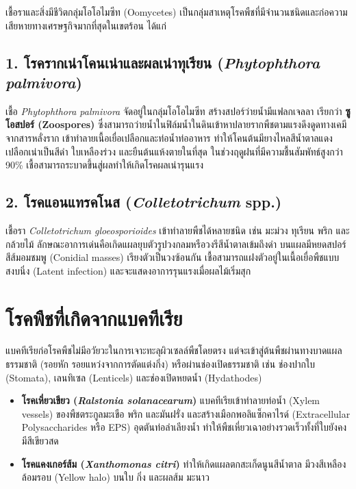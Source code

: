 เชื้อราและสิ่งมีชีวิตกลุ่มโอโอไมซีท (Oomycetes) เป็นกลุ่มสาเหตุโรคพืชที่มีจำนวนชนิดและก่อความเสียหายทางเศรษฐกิจมากที่สุดในเขตร้อน ได้แก่

\subsection{1. โรครากเน่าโคนเน่าและผลเน่าทุเรียน (\textit{Phytophthora palmivora})}
เชื้อ \textit{Phytophthora palmivora} จัดอยู่ในกลุ่มโอโอไมซีท สร้างสปอร์ว่ายน้ำมีแฟลกเจลลา เรียกว่า \textbf{ซูโอสปอร์ (Zoospores)} ซึ่งสามารถว่ายน้ำในฟิล์มน้ำในดินเข้าหาปลายรากพืชตามแรงดึงดูดทางเคมีจากสารหลั่งราก เข้าทำลายเนื้อเยื่อเปลือกและท่อน้ำท่ออาหาร ทำให้โคนต้นมียางไหลสีน้ำตาลแดง เปลือกเน่าเป็นสีดำ ใบเหลืองร่วง และยืนต้นแห้งตายในที่สุด ในช่วงฤดูฝนที่มีความชื้นสัมพัทธ์สูงกว่า 90\% เชื้อสามารถระบาดขึ้นสู่ผลทำให้เกิดโรคผลเน่ารุนแรง

\subsection{2. โรคแอนแทรคโนส (\textit{Colletotrichum} spp.)}
เชื้อรา \textit{Colletotrichum gloeosporioides} เข้าทำลายพืชได้หลายชนิด เช่น มะม่วง ทุเรียน พริก และกล้วยไม้ ลักษณะอาการเด่นคือเกิดแผลยุบตัวรูปวงกลมหรือวงรีสีน้ำตาลเข้มถึงดำ บนแผลมีหยดสปอร์สีส้มอมชมพู (Conidial masses) เรียงตัวเป็นวงซ้อนกัน เชื้อสามารถแฝงตัวอยู่ในเนื้อเยื่อพืชแบบสงบนิ่ง (Latent infection) และจะแสดงอาการรุนแรงเมื่อผลไม้เริ่มสุก

\section{โรคพืชที่เกิดจากแบคทีเรีย}

แบคทีเรียก่อโรคพืชไม่มีอวัยวะในการเจาะทะลุผิวเซลล์พืชโดยตรง แต่จะเข้าสู่ต้นพืชผ่านทางบาดแผลธรรมชาติ (รอยหัก รอยแหว่งจากการตัดแต่งกิ่ง) หรือผ่านช่องเปิดธรรมชาติ เช่น ช่องปากใบ (Stomata), เลนทิเซล (Lenticels) และช่องเปิดหยดน้ำ (Hydathodes)
\begin{itemize}
    \item \textbf{โรคเหี่ยวเขียว (\textit{Ralstonia solanacearum})} แบคทีเรียเข้าทำลายท่อน้ำ (Xylem vessels) ของพืชตระกูลมะเขือ พริก และมันฝรั่ง และสร้างเมือกพอลิแซ็กคาไรด์ (Extracellular Polysaccharides หรือ EPS) อุดตันท่อลำเลียงน้ำ ทำให้พืชเหี่ยวเฉาอย่างรวดเร็วทั้งที่ใบยังคงมีสีเขียวสด
    \item \textbf{โรคแคงเกอร์ส้ม (\textit{Xanthomonas citri})} ทำให้เกิดแผลตกสะเก็ดนูนสีน้ำตาล มีวงสีเหลืองล้อมรอบ (Yellow halo) บนใบ กิ่ง และผลส้ม มะนาว
\end{itemize}

